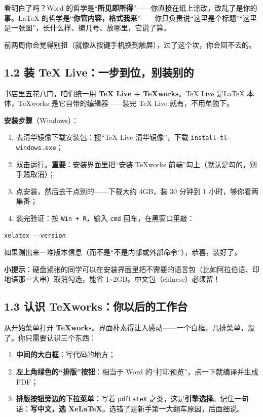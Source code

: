 看明白了吗？Word 的哲学是“\textbf{所见即所得}”——你直接在纸上涂改，改乱了是你的事。LaTeX 的哲学是“\textbf{你管内容，格式我来}”——你只负责说“这里是个标题”“这里是一张图”，长什么样、编几号、放哪里，它说了算。

前两周你会觉得别扭（就像从按键手机换到触屏），过了这个坎，你会回不去的。

\subsection*{1.2 装 TeX Live：一步到位，别装别的}

书店里五花八门，咱们统一用 \textbf{TeX Live + TeXworks}。TeX Live 是LaTeX 本体，TeXworks 是它自带的编辑器——装完 TeX Live 就有，不用单独下。

\textbf{安装步骤}（Windows）：

\begin{enumerate}
\setlength{\itemsep}{2pt}
\item 去清华镜像下载安装包：搜“TeX Live 清华镜像”，下载 \texttt{install-tl-windows.exe}；
\item 双击运行。\textbf{重要}：安装界面里把“安装 TeXworks 前端”勾上（默认是勾的，别手贱取消）；
\item 点安装，然后去干点别的——下载大约 4GB，装 30 分钟到 1 小时，够你看两集番；
\item 装完验证：按 \texttt{Win + R}，输入 \texttt{cmd} 回车，在黑窗口里敲：
\end{enumerate}

\begin{lstlisting}
xelatex --version
\end{lstlisting}

如果蹦出来一堆版本信息（而不是“不是内部或外部命令”），恭喜，装好了。

\begin{notebox}
\textbf{小提示}：硬盘紧张的同学可以在安装界面里把不需要的语言包（比如阿拉伯语、印地语那一大串）取消勾选，能省 1\textasciitilde{}2GB。中文包（chinese）必须留！
\end{notebox}

\subsection*{1.3 认识 TeXworks：你以后的工作台}

从开始菜单打开 \textbf{TeXworks}。界面朴素得让人感动——一个白框，几排菜单，没了。你只需要认识三个东西：

\begin{enumerate}
\setlength{\itemsep}{2pt}
\item \textbf{中间的大白框}：写代码的地方；
\item \textbf{左上角绿色的“排版”按钮}：相当于 Word 的“打印预览”，点一下就编译并生成 PDF；
\item \textbf{排版按钮旁边的下拉菜单}：写着 \texttt{pdfLaTeX} 之类，这是\textbf{引擎选择}。记住一句话：\textbf{写中文，选 XeLaTeX}。选错了是新手第一大翻车原因，后面细说。
\end{enumerate}


